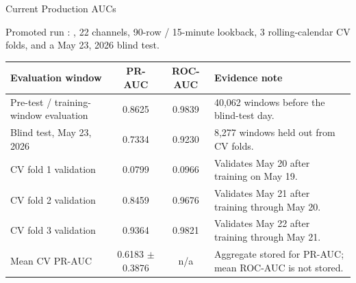 \documentclass[aspectratio=169]{beamer}
\begin{document}
\begin{frame}[shrink=6]{Current Production AUCs}
\scriptsize
\begin{block}{Promoted run}
\small {}: , 22 channels, 90-row / 15-minute lookback, 3 rolling-calendar CV folds, and a May 23, 2026 blind test.
\end{block}
\tightsep
\renewcommand{\arraystretch}{1.08}
\begin{tabularx}{\textwidth}{@{}lccX@{}}
\toprule
\textbf{Evaluation window} & \textbf{PR-AUC} & \textbf{ROC-AUC} & \textbf{Evidence note} \\
\midrule
Pre-test / training-window evaluation & 0.8625 & 0.9839 & 40,062 windows before the blind-test day. \\
Blind test, May 23, 2026 & 0.7334 & 0.9230 & 8,277 windows held out from CV folds. \\
CV fold 1 validation & 0.0799 & 0.0966 & Validates May 20 after training on May 19. \\
CV fold 2 validation & 0.8459 & 0.9676 & Validates May 21 after training through May 20. \\
CV fold 3 validation & 0.9364 & 0.9821 & Validates May 22 after training through May 21. \\
Mean CV PR-AUC & 0.6183 $\pm$ 0.3876 & n/a & Aggregate stored for PR-AUC; mean ROC-AUC is not stored. \\
\bottomrule
\end{tabularx}
\renewcommand{\arraystretch}{1.0}
\tightsep
\begin{center}
\hspace{0.35em}
\hspace{0.35em}
\end{center}
\end{frame}
\end{document}
